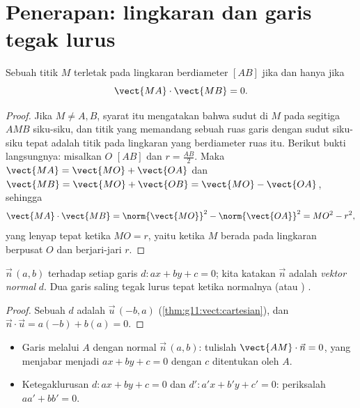 \section{Penerapan: lingkaran dan garis tegak lurus}

\begin{proposition}\label{prop:g11:scal:diameter}
Sebuah titik $M$ terletak pada lingkaran berdiameter $[AB]$ jika dan hanya jika
\[
\vect{MA} \cdot \vect{MB} = 0 .
\]
\end{proposition}

\begin{proof}
Jika $M \neq A, B$, syarat itu mengatakan bahwa sudut di $M$ pada segitiga
$AMB$ siku-siku, dan titik yang memandang sebuah ruas garis dengan sudut
siku-siku tepat adalah titik pada lingkaran yang berdiameter ruas itu. Berikut
bukti langsungnya: misalkan $O$  $[AB]$ dan $r = \frac{AB}{2}$. Maka
$\vect{MA} = \vect{MO} + \vect{OA}$ dan
$\vect{MB} = \vect{MO} + \vect{OB} = \vect{MO} - \vect{OA}$, sehingga
\[
\vect{MA}\cdot\vect{MB}
= \norm{\vect{MO}}^2 - \norm{\vect{OA}}^2 = MO^2 - r^2,
\]
yang lenyap tepat ketika $MO = r$, yaitu ketika $M$ berada pada lingkaran
berpusat $O$ dan berjari-jari $r$.
\end{proof}

\begin{proposition}\label{prop:g11:scal:normal}
 $\vec n\,(a, b)$  terhadap setiap 
garis $d : ax + by + c = 0$; kita katakan $\vec n$ adalah \emph{vektor
normal} $d$. Dua garis saling tegak lurus tepat
ketika  normalnya (atau ) .
\end{proposition}

\begin{proof}
Sebuah  $d$ adalah $\vec u\,(-b, a)$
(\cref{thm:g11:vect:cartesian}), dan
$\vec n \cdot \vec u = a(-b) + b(a) = 0$.
\end{proof}

\begin{method}\label{met:g11:scal:normal}
\begin{itemize}
  \item Garis melalui $A$ dengan normal $\vec n\,(a,b)$: tulislah
        $\vect{AM} \cdot \vec n = 0$, yang menjabar menjadi $ax + by + c = 0$
        dengan $c$ ditentukan oleh $A$.
  \item Ketegaklurusan $d: ax+by+c = 0$ dan $d': a'x+b'y+c' = 0$:
        periksalah $aa' + bb' = 0$.
\end{itemize}
\end{method}

